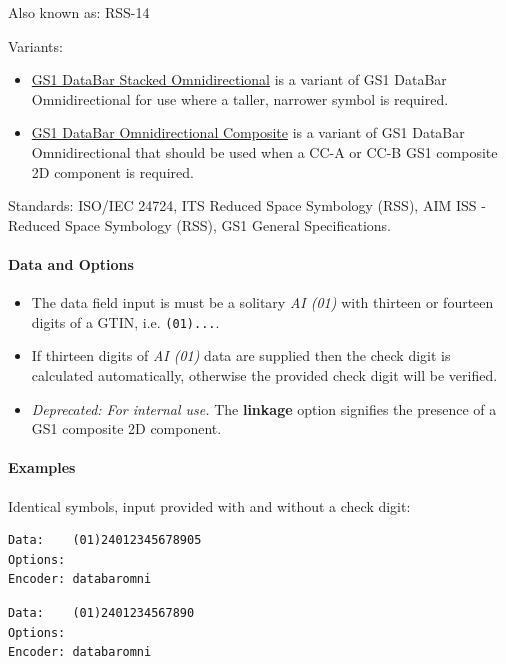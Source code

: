 Also known as: RSS-14

Variants:

\begin{itemize}
\tightlist
\item
  \protect\hyperlink{gs1-databar-stacked-omnidirectional}{GS1 DataBar
  Stacked Omnidirectional} is a variant of GS1 DataBar Omnidirectional
  for use where a taller, narrower symbol is required.
\item
  \protect\hyperlink{gs1-composite-symbols}{GS1 DataBar Omnidirectional
  Composite} is a variant of GS1 DataBar Omnidirectional that should be
  used when a CC-A or CC-B GS1 composite 2D component is required.
\end{itemize}

Standards: ISO/IEC 24724, ITS Reduced Space Symbology (RSS), AIM ISS -
Reduced Space Symbology (RSS), GS1 General Specifications.

\hypertarget{data-and-options-34}{%
\paragraph{Data and Options}\label{data-and-options-34}}

\begin{itemize}
\tightlist
\item
  The data field input is must be a solitary \emph{AI (01)} with
  thirteen or fourteen digits of a GTIN, i.e. \texttt{(01)...}.
\item
  If thirteen digits of \emph{AI (01)} data are supplied then the check
  digit is calculated automatically, otherwise the provided check digit
  will be verified.
\item
  \emph{Deprecated: For internal use.} The \textbf{linkage} option
  signifies the presence of a GS1 composite 2D component.
\end{itemize}

\hypertarget{examples-24}{%
\paragraph{Examples}\label{examples-24}}

Identical symbols, input provided with and without a check digit:

\begin{verbatim}
Data:    (01)24012345678905
Options: 
Encoder: databaromni
\end{verbatim}

\begin{verbatim}
Data:    (01)2401234567890
Options: 
Encoder: databaromni
\end{verbatim}

